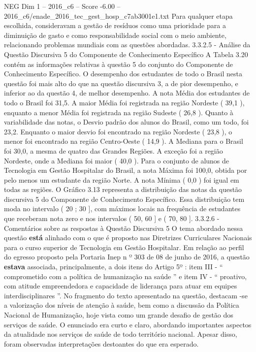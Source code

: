 \begin{textsample}{NEG Dim 1 – 2016\_c6 – Score -6.00 – 2016\_c6/enade\_2016\_tec\_gest\_hosp\_c7ab3001e1.txt}
Para qualquer etapa escolhida, consideravam a gestão de resíduos como uma prioridade para a diminuição de gasto e como responsabilidade social com o meio ambiente, relacionando problemas mundiais com as questões abordadas. 3.3.2.5 - Análise da Questão Discursiva 5 do Componente de Conhecimento Específico A Tabela 3.20 contém as informações relativas à questão 5 do conjunto do Componente de Conhecimento Específico.
O desempenho dos estudantes de todo o Brasil nesta questão foi mais alto do que na questão discursiva 3, a de pior desempenho, e inferior ao da questão 4, de melhor desempenho.
A nota Média dos estudantes de todo o Brasil foi 31,5.
A maior Média foi registrada na região Nordeste ( 39,1 ), enquanto a menor Média foi registrada na região Sudeste ( 26,8 ).
Quanto à variabilidade das notas, o Desvio padrão dos alunos do Brasil, como um todo, foi 23,2.
Enquanto o maior desvio foi encontrado na região Nordeste ( 23,8 ), o menor foi encontrado na região Centro-Oeste ( 14,9 ).
A Mediana para o Brasil foi 30,0, a mesma de quatro das Grandes Regiões.
A exceção foi a região Nordeste, onde a Mediana foi maior ( 40,0 ).
Para o conjunto de alunos de Tecnologia em Gestão Hospitalar do Brasil, a nota Máxima foi 100,0, obtida por pelo menos um estudante da região Norte.
A nota Mínima ( 0,0 ) foi igual em todas as regiões.
O Gráfico 3.13 representa a distribuição das notas da questão discursiva 5 do Componente de Conhecimento Específico.
Essa distribuição tem moda no intervalo ( 20 ; 30 ], com máximos locais na frequência de estudantes que receberam nota zero e nos intervalos ( 50, 60 ] e ( 70, 80 ]. 3.3.2.6 - Comentários sobre as respostas à Questão Discursiva 5 O tema abordado nessa questão \textbf{está} alinhado com o que é proposto nas Diretrizes Curriculares Nacionais para o curso superior de Tecnologia em Gestão Hospitalar.
Em relação ao perfil do egresso proposto pela Portaria Inep n º 303 de 08 de junho de 2016, a questão \textbf{estava} associada, principalmente, a dois itens do Artigo 5º : item III - “ comprometido com a política de humanização na saúde ” e item IV - “ proativo, com atitude empreendedora e capacidade de liderança para atuar em equipes interdisciplinares ”.
No fragmento do texto apresentado na questão, destacam -se a valorização dos níveis de atenção à saúde, bem como a discussão da Política Nacional de Humanização, hoje vista como um grande desafio de gestão dos serviços de saúde.
O enunciado era curto e claro, abordando importantes aspectos da atualidade nos serviços de saúde de todo território nacional.
Apesar disso, foram observadas interpretações destoantes do que era esperado.

\end{textsample}
